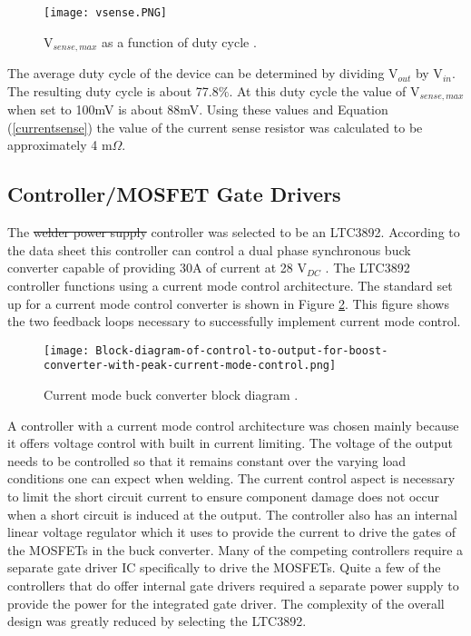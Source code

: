 \documentclass[11pt]{article}
\providecommand{\DIFadd}[1]{{\protect\color{blue}\uwave{#1}}} %
\providecommand{\DIFdel}[1]{{\protect\color{red}\sout{#1}}}                      %
\providecommand{\DIFaddbegin}{} %
\providecommand{\DIFaddend}{} %
\providecommand{\DIFdelbegin}{} %
\providecommand{\DIFdelend}{} %
\newcommand{\DIFscaledelfig}{0.5}
\newlength{\DIFdelgraphicswidth} %
\newlength{\DIFdelgraphicsheight} %
\newcommand{\DIFaddincludegraphics}[2][]{{\color{blue}\fbox{\DIFOincludegraphics[#1]{#2}}}} %
\newcommand{\DIFdelincludegraphics}[2][]{%
\sbox{\DIFdelgraphicsbox}{\DIFOincludegraphics[#1]{#2}}%
\settoboxwidth{\DIFdelgraphicswidth}{\DIFdelgraphicsbox} %
\settoboxtotalheight{\DIFdelgraphicsheight}{\DIFdelgraphicsbox} %
\scalebox{\DIFscaledelfig}{%
\parbox[b]{\DIFdelgraphicswidth}{\usebox{\DIFdelgraphicsbox}\\[-\baselineskip] \rule{\DIFdelgraphicswidth}{0em}}\llap{\resizebox{\DIFdelgraphicswidth}{\DIFdelgraphicsheight}{%
\setlength{\unitlength}{\DIFdelgraphicswidth}%
\begin{picture}(1,1)%
\thicklines\linethickness{2pt} %
{\color[rgb]{1,0,0}\put(0,0){\framebox(1,1){}}}%
{\color[rgb]{1,0,0}\put(0,0){\line( 1,1){1}}}%
{\color[rgb]{1,0,0}\put(0,1){\line(1,-1){1}}}%
\end{picture}%
}\hspace*{3pt}}} %
} %
\DeclareRobustCommand{\DIFaddbegin}{\DIFOaddbegin \let\includegraphics\DIFaddincludegraphics} %
\DeclareRobustCommand{\DIFaddend}{\DIFOaddend \let\includegraphics\DIFOincludegraphics} %
\DeclareRobustCommand{\DIFdelbegin}{\DIFOdelbegin \let\includegraphics\DIFdelincludegraphics} %
\DeclareRobustCommand{\DIFdelend}{\DIFOaddend \let\includegraphics\DIFOincludegraphics} %
\begin{document}
    \begin{figure}[H]
        \centering
        \texttt{[image: vsense.PNG]}
        \caption{V$_{sense,max}$ as a function of duty cycle
        \cite{linear_technology_ltc3892:_nodate}.}
        \label{sensemax}
    \end{figure}

    \noindent The average duty cycle of the device can be determined by dividing V$_{out}$ by V$_{in}$. The resulting duty cycle is about 77.8$\%$. At this duty cycle the value of V$_{sense,max}$ when set to 100mV is about 88mV. Using these values and Equation (\ref{currentsense}) the value of the current sense resistor was calculated to be approximately 4 m$\Omega$.

    \subsection{Controller/MOSFET Gate Drivers}

    \noindent The \DIFdelbegin \DIFdel{welder power supply }\DIFdelend \DIFaddbegin \DIFadd{CSDD }\DIFaddend controller was selected to be an LTC3892. According to the data sheet this controller can control a dual phase synchronous buck converter capable of providing 30A of current at 28 V$_{DC}$ \cite{linear_technology_ltc3892:_nodate}. The LTC3892 controller functions using a current mode control architecture. The standard set up for a current mode control converter is shown in Figure \ref{currentmode}. This figure shows the two feedback loops necessary to successfully implement current mode control.

    \begin{figure}[H]
        \centering
        \texttt{[image: Block-diagram-of-control-to-output-for-boost-converter-with-peak-current-mode-control.png]}
        \caption{Current mode buck converter block diagram \cite{shen_yaur_chen_block_2016}.}
        \label{currentmode}
    \end{figure}

    \noindent A controller with a current mode control architecture was chosen mainly because it offers voltage control with built in current limiting. The voltage of the output needs to be controlled so that it remains constant over the varying load conditions one can expect when welding. The current control aspect is necessary to limit the short circuit current to ensure component damage does not occur when a short circuit is induced at the output.
    \newline
    \newline
    \noindent The controller also has an internal linear voltage regulator which it uses to provide the current to drive the gates of the MOSFETs in the buck converter. Many of the competing controllers require a separate gate driver IC specifically to drive the MOSFETs. Quite a few of the controllers that do offer internal gate drivers required a separate power supply to provide the power for the integrated gate driver. The complexity of the overall design was greatly reduced by selecting the LTC3892.
\end{document}
